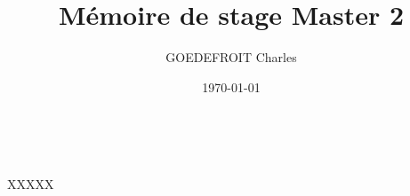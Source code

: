 \documentclass[11pt, a4paper]{article}
\title{Mémoire de stage Master 2}
\author{GOEDEFROIT Charles}
\date{\today}
\begin{document}
\begin{titlepage}
  \centering
  \ {} %
  \vfill
  \vspace{1cm}
  {\scshape\Huge\MyTitle\par}
  \vspace{0.5cm}
  {\LARGE\MySubject\par}
  \vspace{0.5cm}
  {\Large XXXXX\par}
  \vspace{1cm}
  \MyAuthor
  \vfill
  {\large\MyDate\par}
\end{titlepage}

\newpage

\tableofcontents

\newpage












\renewcommand{\refname}{Bibliographie}
\let\Section\section
\def\section*#1{\Section{#1}}


\nocite{*}
\end{document}
